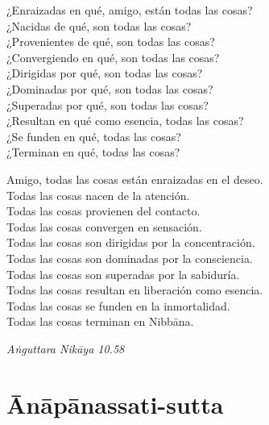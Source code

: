 \begin{english}
  ¿Enraizadas en qué, amigo, están todas las cosas?\\
  ¿Nacidas de qué, son todas las cosas?\\
  ¿Provenientes de qué, son todas las cosas?\\
  ¿Convergiendo en qué, son todas las cosas?\\
  ¿Dirigidas por qué, son todas las cosas?\\
  ¿Dominadas por qué, son todas las cosas?\\
  ¿Superadas por qué, son todas las cosas?\\
  ¿Resultan en qué como esencia, todas las cosas?\\
  ¿Se funden en qué, todas las cosas?\\
  ¿Terminan en qué, todas las cosas?

  \bigskip

  Amigo, todas las cosas están enraizadas en el deseo.\\
  Todas las cosas nacen de la atención.\\
  Todas las cosas provienen del contacto.\\
  Todas las cosas convergen en sensación.\\
  Todas las cosas son dirigidas por la concentración.\\
  Todas las cosas son dominadas por la consciencia.\\
  Todas las cosas son superadas por la sabiduría.\\
  Todas las cosas resultan en liberación como esencia.\\
  Todas las cosas se funden en la inmortalidad.\\
  Todas las cosas terminan en Nibbāna.

\end{english}

{\raggedleft
  \emph{Aṅguttara Nikāya 10.58}
\par}

\chapter{Ānāpānassati-sutta}


\begin{leader}
\end{leader}

